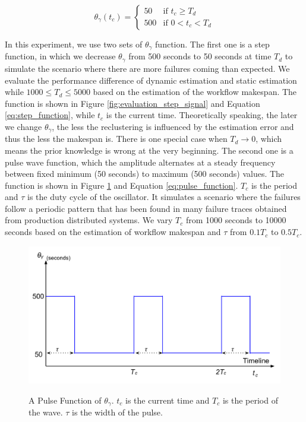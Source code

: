 \begin{equation}
\label{eq:step_function}
 \theta_{\gamma}(t_c) =
  \begin{cases}
   50 & \text{if } t_c \geq T_d \\
   500       & \text{if } 0< t_c < T_d
  \end{cases}
\end{equation}

In this experiment, we use two sets of $\theta_{\gamma}$ function. The first one is a step function, in which we decrease $\theta_{\gamma}$ from 500 seconds to 50 seconds at time $T_d$ to simulate the scenario where there are more failures coming than expected. We evaluate the performance difference of dynamic estimation and static estimation while $1000\leq T_d\leq 5000$ based on the estimation of the workflow makespan. The function is shown  in Figure \ref{fig:evaluation_step_signal} and Equation \ref{eq:step_function}, while $t_c$ is the current time. Theoretically speaking, the later we change $\theta_{\gamma}$, the less the reclustering is influenced by the estimation error and thus the less the makespan is. There is one special case when $T_d\to 0$, which means the prior knowledge is wrong at the very beginning. The second one is a pulse wave function, which the amplitude alternates at a steady frequency between fixed minimum (50 seconds) to maximum (500 seconds) values. The function is shown in Figure \ref{fig:evaluation_pulse_signal} and Equation \ref{eq:pulse_function}. $T_c$ is the period and $\tau$ is the duty cycle of the oscillator. It simulates a scenario where the failures follow a periodic pattern \cite{yigitbasi2010analysis} that has been found in many failure traces obtained from production distributed systems. We vary $T_c$ from 1000 seconds to 10000 seconds based on the estimation of workflow makespan and $\tau$ from $0.1T_c$ to $0.5T_c$. 


\begin{figure}[htb]
	\centering
	\includegraphics[width=0.6\linewidth]{figures/tolerance/pulse_signal.pdf} \\
	\caption{A Pulse Function of $\theta_{\gamma}$. $t_c$ is the current time and $T_c$ is the period of the wave. $\tau$ is the width of the pulse. }
	\label{fig:evaluation_pulse_signal}
\end{figure}


